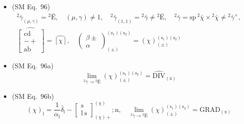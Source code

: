 \documentclass[
    12pt,              %
    a4paper,           %
    headings=normal,   %
    twoside=true,      %
    BCOR=8mm,          %
]{scrbook}
\begin{document}
\begin{itemize}[label={},leftmargin=0pt]
    \item (SM Eq.\ 96) 
    \[
    \begin{gathered}
    {}^2\bar{\gamma}_{(\mu,\gamma)} = {}^2\bar{\mathrm{E}}, \quad (\mu, \gamma) \ne 1, \quad {}^2\bar{\gamma}_{(1,1)} = {}^2\bar{\gamma} \ne {}^2\bar{\mathrm{E}}, \quad {}^2\bar{\gamma} = \mathrm{sp}\,{}^2\bar{\chi} \times {}^2\bar{\chi} \ne {}^2\bar{\gamma}^\times, \\
    \widehat{\left[ \begin{smallmatrix} \mathrm{cd} \\ - + \\ \mathrm{ab} \end{smallmatrix} \right]} = \widehat{[\chi]}, \quad \left( \begin{smallmatrix} \beta \pm \\ \alpha \end{smallmatrix} \right)^{(\mathrm{s}_1)(\mathrm{s}_2)}_{(\pm)} = (\chi)^{(\mathrm{s}_1)(\mathrm{s}_2)}_{(\pm)}
    \end{gathered}
    \]

    \item (SM Eq.\ 96a) 
    \[
    \lim_{{}^2\bar{\gamma} \to {}^2\bar{\mathrm{E}}} (\chi)^{(\mathrm{s}_1)(\mathrm{s}_2)}_{(\pm)} = \widehat{\mathrm{DIV}}_{(\mathrm{x})}
    \]

    \item (SM Eq.\ 96b) 
    \[
    (\chi)_\mathrm{l} = \frac{1}{\alpha_\mathrm{l}}\bar{\delta}_\mathrm{l} - \left[ \begin{smallmatrix} \mathrm{s} \\ \mathrm{l}\ \mathrm{s} \end{smallmatrix} \right]^{(\chi)}_{(\chi)+};\mathrm{n}, \quad \lim_{{}^2\bar{\gamma} \to {}^2\bar{\mathrm{E}}} (\chi)^{(\mathrm{s}_1)(\mathrm{s}_2)}_{(\pm)} = \mathrm{GRAD}_{(\mathrm{x})}
    \]


\end{itemize}
\end{document}
